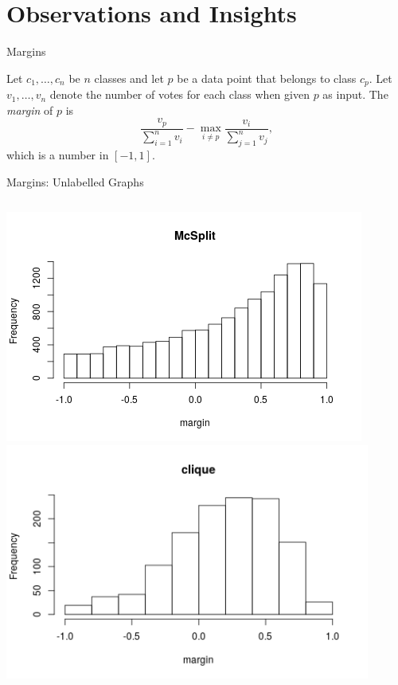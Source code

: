 \documentclass{beamer}
\begin{document}
\section{Observations and Insights}

\begin{frame}{Margins}
  \begin{definition}
    Let $c_1, \dots, c_n$ be $n$ classes and let $p$ be a data point that belongs
    to class $c_p$. Let $v_1, \dots, v_n$ denote the number of votes for each
    class when given $p$ as input. The \emph{margin} of $p$ is
    \[ \frac{v_p}{\sum_{i=1}^n v_i} - \max_{i \ne p} \frac{v_i}{\sum_{j=1}^n v_j}, \]
    which is a number in $[-1, 1]$.
  \end{definition}
\end{frame}

\begin{frame}{Margins: Unlabelled Graphs}
  \begin{columns}[t]
    \begin{column}{0.5\textwidth}
      \centering
      \includegraphics[width=\textwidth,height=0.4\textheight,keepaspectratio]{../dissertation/images/mcsplit_hist.png}
      \includegraphics[width=0.9\textwidth,height=0.4\textheight,keepaspectratio]{../dissertation/images/clique_hist.png}

\end{column}
\end{columns}
\end{frame}
\end{document}
